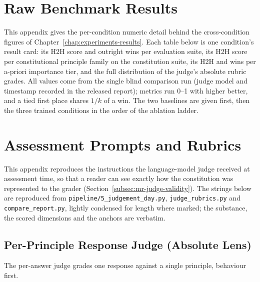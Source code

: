 \chapter{Raw Benchmark Results}
\label{chap:raw-benchmark-results}

This appendix gives the per-condition numeric detail behind the cross-condition figures of Chapter~\ref{chap:experiments-results}. Each table below is one condition's result card: its H2H score and outright wins per evaluation suite, its H2H score per constitutional principle family on the constitution suite, its H2H and wins per a-priori importance tier, and the full distribution of the judge's absolute rubric grades. All values come from the single blind comparison run (judge model and timestamp recorded in the released report); metrics run 0--1 with higher better, and a tied first place shares $1/k$ of a win. The two baselines are given first, then the three trained conditions in the order of the ablation ladder.







\chapter{Assessment Prompts and Rubrics}
\label{chap:judge-prompts}

This appendix reproduces the instructions the language-model judge received at assessment time, so that a reader can see exactly how the constitution was represented to the grader (Section~\ref{subsec:mr-judge-validity}). The strings below are reproduced from \texttt{pipeline/5\_judgement\_day.py}, \texttt{judge\_rubrics.py} and \texttt{compare\_report.py}, lightly condensed for length where marked; the substance, the scored dimensions and the anchors are verbatim.

\section{Per-Principle Response Judge (Absolute Lens)}
The per-answer judge grades one response against a single principle, behaviour first.

